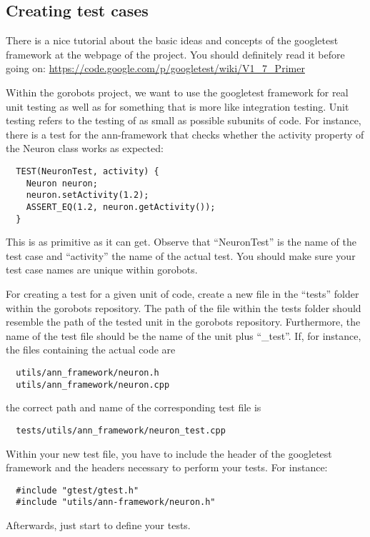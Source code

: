 \subsection{Creating test cases}
There is a nice tutorial about the basic ideas and concepts of the googletest
framework at the webpage of the project. 
You should definitely read it before going on:
\url{https://code.google.com/p/googletest/wiki/V1_7_Primer}

Within the gorobots project, we want to use the googletest framework for real 
unit testing as well as for something that is more like integration testing.
Unit testing refers to the testing of as small as possible subunits of code.
For instance, there is a test for the ann-framework that checks whether the 
activity property of the Neuron class works as expected:
\begin{lstlisting}
  TEST(NeuronTest, activity) {
    Neuron neuron;
    neuron.setActivity(1.2);
    ASSERT_EQ(1.2, neuron.getActivity());
  }
\end{lstlisting}
This is as primitive as it can get. Observe that ``NeuronTest'' is the name of 
the test case and ``activity'' the name of the actual test. You should make sure
your test case names are unique within gorobots.

For creating a test for a given unit of code, create a new file in the  
``tests''  folder within the gorobots repository.
The path of the file within the tests folder should resemble the path of the 
tested unit in the gorobots repository.
Furthermore, the name of the test file should be the name of the unit plus 
``\_test''.
If, for instance, the files containing the actual code are
\begin{lstlisting}
  utils/ann_framework/neuron.h
  utils/ann_framework/neuron.cpp
\end{lstlisting}
the correct path and name of the corresponding test file is
\begin{lstlisting}
  tests/utils/ann_framework/neuron_test.cpp
\end{lstlisting}
Within your new test file, you have to include the header of the googletest
framework and the headers necessary to perform your tests. For instance:
\begin{lstlisting}
  #include "gtest/gtest.h"
  #include "utils/ann-framework/neuron.h"
\end{lstlisting}
Afterwards, just start to define your tests.

